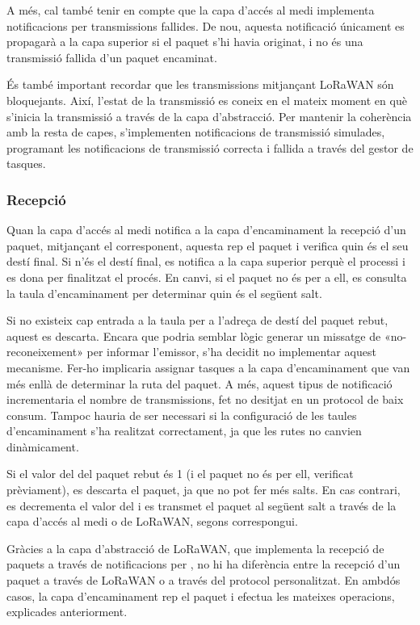 \documentclass{tfgitic}[2024/07/01]
\begin{document}
{A més, cal també tenir en compte que la capa d'accés al medi implementa notificacions per transmissions fallides. De nou, aquesta notificació únicament es propagarà a la capa superior si el paquet s'hi havia originat, i no és una transmissió fallida d'un paquet encaminat. 

És també important recordar que les transmissions mitjançant LoRaWAN són bloquejants. Així, l'estat de la transmissió es coneix en el mateix moment en què s'inicia la transmissió a través de la capa d'abstracció. Per mantenir la coherència amb la resta de capes, s'implementen notificacions de transmissió simulades, programant les notificacions de transmissió correcta i fallida a través del gestor de tasques.
\subsubsection{Recepció}
\label{subsubsec:routing_rx}
Quan la capa d'accés al medi notifica a la capa d'encaminament la recepció d'un paquet, mitjançant el  corresponent, aquesta rep el paquet i verifica quin és el seu destí final. Si n'és el destí final, es notifica a la capa superior perquè el processi i es dona per finalitzat el procés. En canvi, si el paquet no és per a ell, es consulta la taula d'encaminament per determinar quin és el següent salt.

Si no existeix cap entrada a la taula per a l'adreça de destí del paquet rebut, aquest es descarta. Encara que podria semblar lògic generar un missatge de «no-reconeixement» per informar l'emissor, s'ha decidit no implementar aquest mecanisme. Fer-ho implicaria assignar tasques a la capa d'encaminament que van més enllà de determinar la ruta del paquet. A més, aquest tipus de notificació incrementaria el nombre de transmissions, fet no desitjat en un protocol de baix consum. Tampoc hauria de ser necessari si la configuració de les taules d'encaminament s'ha realitzat correctament, ja que les rutes no canvien dinàmicament.

Si el valor del  del paquet rebut és 1 (i el paquet no és per ell, verificat prèviament), es descarta el paquet, ja que no pot fer més salts. En cas contrari, es decrementa el valor del  i es transmet el paquet al següent salt a través de la capa d'accés al medi o de LoRaWAN, segons correspongui.

Gràcies a la capa d'abstracció de LoRaWAN, que implementa la recepció de paquets a través de notificacions per , no hi ha diferència entre la recepció d'un paquet a través de LoRaWAN o a través del protocol personalitzat. En ambdós casos, la capa d'encaminament rep el paquet i efectua les mateixes operacions, explicades anteriorment.

}
\end{document}
